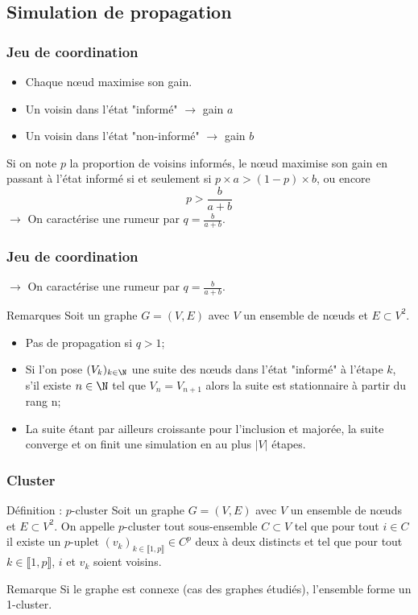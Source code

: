 \documentclass{beamer}
\begin{document}
\subsection{Simulation de propagation}
\begin{frame}
  \frametitle{Jeu de coordination}
  \begin{itemize}
    \item Chaque nœud maximise son gain.
    \item Un voisin dans l'état "informé" $\rightarrow$ gain $a$
    \item Un voisin dans l'état "non-informé" $\rightarrow$ gain $b$
  \end{itemize}
    Si on note $p$ la proportion de voisins informés, le nœud maximise son gain en passant à l'état informé si et seulement si $ p\times a > (1-p) \times b $, ou encore $$ p > \frac{b}{a+b}$$
    $\rightarrow$ On caractérise une rumeur par $q = \frac{b}{a+b}$.

\end{frame}

\begin{frame}
  \frametitle{Jeu de coordination}
  $\rightarrow$ On caractérise une rumeur par $q = \frac{b}{a+b}$.
  \begin{block}{Remarques}
    Soit un graphe $G = (V, E)$ avec $V$ un ensemble de nœuds et $E \subset V^2$.
    \begin{itemize}
      \item Pas de propagation si $q>1$;
      \item Si l'on pose $(V_k)_{k\in\N}$ une suite des nœuds dans l'état "informé" à l'étape $k$, s'il existe $n\in\N$ tel que $V_n = V_{n+1}$ alors la suite est stationnaire à partir du rang n;
      \item La suite étant par ailleurs croissante pour l'inclusion et majorée, la suite converge et on finit une simulation en au plus $|V|$ étapes.
    \end{itemize}
  \end{block}
\end{frame}

\begin{frame}
  \frametitle{Cluster}
  \begin{block}{Définition : $p$-cluster}
    Soit un graphe $G = (V, E)$ avec $V$ un ensemble de nœuds et $E \subset V^2$. On appelle $p$-cluster tout sous-ensemble $C \subset V$ tel que pour tout $i\in C$ il existe un $p$-uplet $(v_k)_{k\in \llbracket1,p\rrbracket} \in C^p$ deux à deux distincts et tel que pour tout $k\in \llbracket1,p\rrbracket$, $i$ et $v_k$ soient voisins.
  \end{block}
  \begin{block}{Remarque}
    Si le graphe est connexe (cas des graphes étudiés), l'ensemble forme un 1-cluster.
  \end{block}
\end{frame}
\end{document}
